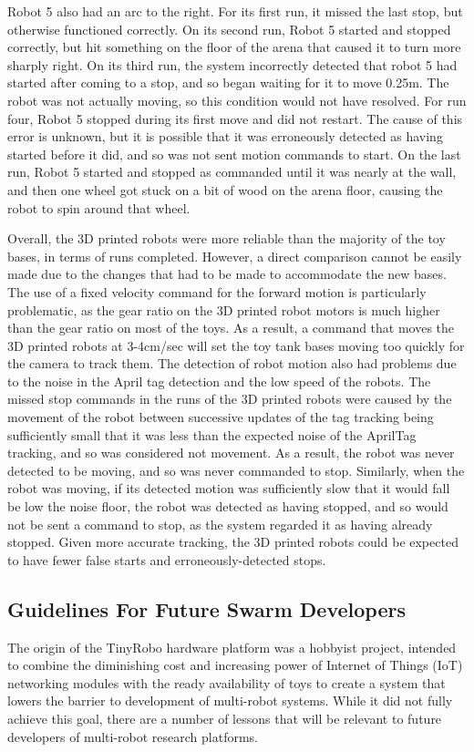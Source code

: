 Robot 5 also had an arc to the right. For its first run, it missed the last stop, but otherwise functioned correctly. 
On its second run, Robot 5 started and stopped correctly, but hit something on the floor of the arena that caused it to turn more sharply right. 
On its third run, the system incorrectly detected that robot 5 had started after coming to a stop, and so began waiting for it to move 0.25m. 
The robot was not actually moving, so this condition would not have resolved. 
For run four, Robot 5 stopped during its first move and did not restart.
The cause of this error is unknown, but it is possible that it was erroneously detected as having started before it did, and so was not sent motion commands to start. 
On the last run, Robot 5 started and stopped as commanded until it was nearly at the wall, and then one wheel got stuck on a bit of wood on the arena floor, causing the robot to spin around that wheel. 

Overall, the 3D printed robots were more reliable than the majority of the toy bases, in terms of runs completed. 
However, a direct comparison cannot be easily made due to the changes that had to be made to accommodate the new bases. 
The use of a fixed velocity command for the forward motion is particularly problematic, as the gear ratio on the 3D printed robot motors is much higher than the gear ratio on most of the toys. 
As a result, a command that moves the 3D printed robots at 3-4cm/sec will set the toy tank bases moving too quickly for the camera to track them. 
The detection of robot motion also had problems due to the noise in the April tag detection and the low speed of the robots. 
The missed stop commands in the runs of the 3D printed robots were caused by the movement of the robot between successive updates of the tag tracking being sufficiently small that it was less than the expected noise of the AprilTag tracking, and so was considered not movement. 
As a result, the robot was never detected to be moving, and so was never commanded to stop. 
Similarly, when the robot was moving, if its detected motion was sufficiently slow that it would fall be low the noise floor, the robot was detected as having stopped, and so would not be sent a command to stop, as the system regarded it as having already stopped. 
Given more accurate tracking, the 3D printed robots could be expected to have fewer false starts and erroneously-detected stops.  

\subsection{Guidelines For Future Swarm Developers}
The origin of the TinyRobo hardware platform was a hobbyist project, intended to combine the diminishing cost and increasing power of Internet of Things (IoT) networking modules with the ready availability of toys to create a system that lowers the barrier to development of multi-robot systems.
While it did not fully achieve this goal, there are a number of lessons that will be relevant to future developers of multi-robot research platforms. 

